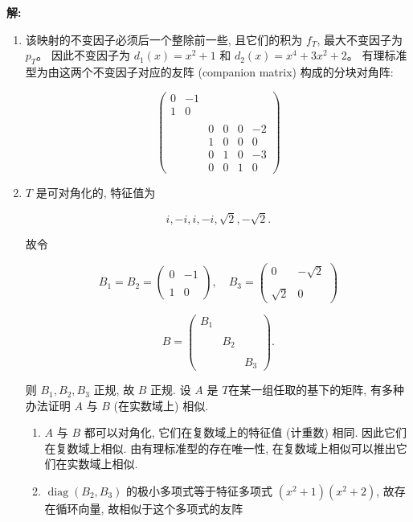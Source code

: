 \textbf{解:}

\begin{enumerate}
\item
  该映射的不变因子必须后一个整除前一些, 
  且它们的积为 \(f_{T}\), 最大不变因子为 \(p_{T}\)。
  因此不变因子为 \(d_{1}(x) = x^{2} + 1\) 和 \(d_{2}(x) = x^{4} + 3x^{2} + 2\)。
  有理标准型为由这两个不变因子对应的友阵 (companion matrix) 构成的分块对角阵:

\[\begin{pmatrix} 0 & - 1 & & & \\ 1 & 0 & & & \\ \\ 
& & 0 & 0 & 0 & - 2 \\ & & 1 & 0 & 0 & 0 \\ 
& & 0 & 1 & 0 & - 3 \\ & & 0 & 0 & 1 & 0 \end{pmatrix}\]

\item
  $T$ 是可对角化的, 特征值为

\[i, -i, i, -i, \sqrt{2}, -\sqrt{2}.\]

故令

\[B_{1} = B_{2} = \begin{pmatrix} 0 & - 1 \\ \\ 1 & 0 \end{pmatrix}, 
\quad B_{3} = \begin{pmatrix} 0 & - \sqrt {2} \\ \\ \sqrt {2} & 0 \end{pmatrix}\]

\[B = \begin{pmatrix} B_{1} & & \\ \\ & B_{2} & \\ \\ & & B_{3} \end{pmatrix}.\]

则 \(B_{1}, B_{2}, B_{3}\) 正规, 故 \(B\) 正规. 
设 \(A\) 是 \(T\)在某一组任取的基下的矩阵, 
有多种办法证明 \(A\) 与 \(B\) (在实数域上) 相似.

\begin{enumerate}
\item
  $A$ 与 $B$ 都可以对角化, 它们在复数域上的特征值 (计重数) 相同.
  因此它们在复数域上相似. 由有理标准型的存在唯一性,
  在复数域上相似可以推出它们在实数域上相似.
\item
  \(\operatorname{diag}(B_2, B_3)\) 的极小多项式等于特征多项式 \((x^2 + 1)(x^2 + 2)\), 
  故存在循环向量, 故相似于这个多项式的友阵


\end{enumerate}
\end{enumerate}
